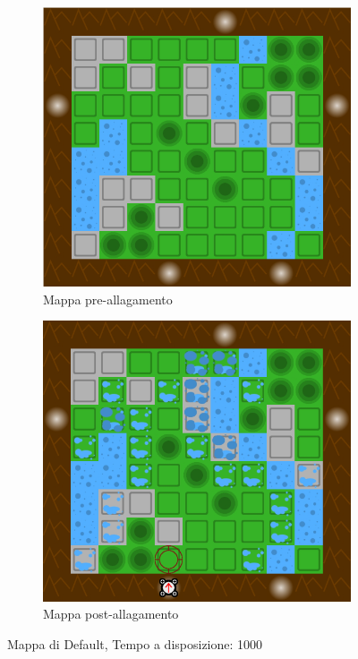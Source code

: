 \begin{figure}
        \centering
        \begin{subfigure}[b]{0.5\textwidth}
                \includegraphics[width=\textwidth]{maps/default.png}
                \caption{Mappa pre-allagamento}
                \label{fig:default-pre}
        \end{subfigure}%

        \begin{subfigure}[b]{0.5\textwidth}
                \includegraphics[width=\textwidth]{maps/default-flood.png}
                \caption{Mappa post-allagamento}
                \label{fig:default-post}
        \end{subfigure}
       
        \caption{Mappa di Default, Tempo a disposizione: 1000}\label{fig:default-all}
\end{figure}
